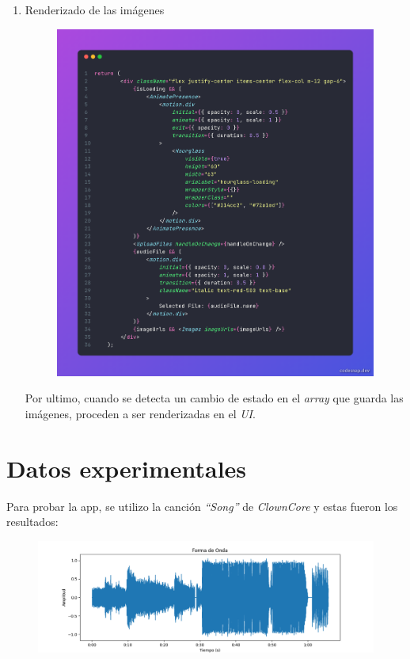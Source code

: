 \documentclass[letterpaper, 12pt]{article}
\begin{document}
\begin{enumerate}
	\item Renderizado de las imágenes
	      \begin{figure}[H]
		      \begin{center}
			      \includegraphics[width=.8\linewidth]{Images/RenderizeApp.png}
		      \end{center}
	      \end{figure}

	      Por ultimo, cuando se detecta un cambio de estado en el
	      \textit{array} que guarda las imágenes, proceden a ser
	      renderizadas en el \textit{UI}.
\end{enumerate}

\section*{Datos experimentales}

\nocite{ClownCore}

Para probar la app, se utilizo la canción \textit{``Song''}
de \textit{ClownCore} y estas fueron los resultados:

\begin{figure}[H]
	\begin{center}
		\includegraphics[width=\linewidth]{Images/testWaveShape.png}
		\caption{}
	\end{center}
\end{figure}
\end{document}
